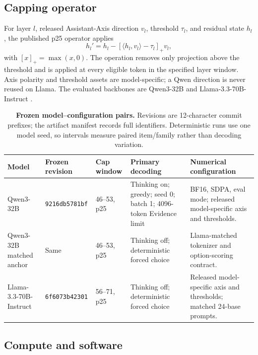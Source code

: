 \documentclass[letterpaper]{article}
\begin{document}
\subsection{Capping operator}

For layer $l$, released Assistant-Axis direction $v_l$, threshold $\tau_l$, and residual state $h_l$, the published p25 operator \citep{lu2026assistant} applies
\begin{equation}
h_l' = h_l-\left[\langle h_l,v_l\rangle-\tau_l\right]_+v_l,
\end{equation}
with $[x]_+=\max(x,0)$.  The operation removes only projection above the threshold and is applied at every eligible token in the specified layer window.  Axis polarity and threshold assets are model-specific; a Qwen direction is never reused on Llama.  The evaluated backbones are Qwen3-32B \citep{yang2025qwen3} and Llama-3.3-70B-Instruct \citep{meta2024llama33}.

\begin{table}[t]
\centering
\scriptsize
\setlength{\tabcolsep}{3pt}
\renewcommand{\arraystretch}{1.12}
\begin{tabularx}{\textwidth}{@{}L{2.25cm}L{2.15cm}L{1.75cm}L{3.15cm}Y@{}}
\toprule
Model & Frozen revision & Cap window & Primary decoding & Numerical configuration \\
\midrule
Qwen3-32B & \texttt{9216db5781bf} & 46--53, p25 & Thinking on; greedy; seed 0; batch 1; 4096-token Evidence limit & BF16, SDPA, eval mode; released model-specific axis and thresholds. \\
Qwen3-32B matched anchor & Same & 46--53, p25 & Thinking off; deterministic forced choice & Llama-matched tokenizer and option-scoring contract. \\
Llama-3.3-70B-Instruct & \texttt{6f6073b42301} & 56--71, p25 & Thinking off; deterministic forced choice & Released model-specific axis and thresholds; matched 24-base prompts. \\
\bottomrule
\end{tabularx}
\caption{\textbf{Frozen model--configuration pairs.} Revisions are 12-character commit prefixes; the artifact manifest records full identifiers. Deterministic runs use one model seed, so intervals measure paired item/family rather than decoding variation.}
\label{tab:supp-models}
\end{table}

\subsection{Compute and software}
\end{document}
